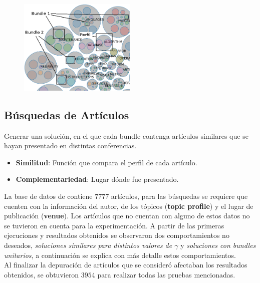 \begin{figure}[H]
  \centering
    \includegraphics[width=0.5\textwidth]{img/explain-bubbles.png}
  \caption{}
  \label{res:img-explain-bubbles}
\end{figure}
\subsection{Búsquedas de Artículos}\label{res:busPaper}
Generar una solución, en el que cada bundle contenga artículos similares que se hayan presentado en distintas conferencias.\\
\begin{itemize}
  \item \textbf{Similitud}: Función que compara el perfil de cada artículo.
  \item \textbf{Complementariedad}: Lugar dónde fue presentado.
\end{itemize}

La base de datos de \cite{dataDrive} contiene $7777$ artículos, para las búsquedas se requiere que cuenten con la información del autor, de los tópicos (\textbf{topic profile}) y el lugar de publicación (\textbf{venue}). Los artículos que no cuentan con alguno de estos datos no se tuvieron en cuenta para la experimentación. A partir de las primeras ejecuciones y resultados obtenidos se observaron dos comportamientos no deseados, \textit{soluciones similares para distintos valores de $\gamma$} y \textit{soluciones con bundles unitarios}, a continuación se explica con más detalle estos comportamientos.\\
Al finalizar la depuración de artículos que se consideró afectaban los resultados obtenidos, se obtuvieron $3954$ para realizar todas las pruebas mencionadas.
